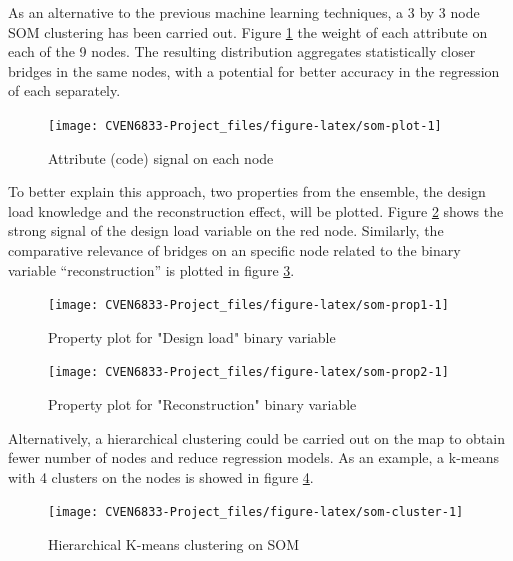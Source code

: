 \documentclass[]{book}
\theoremstyle{definition}
\theoremstyle{definition}
\theoremstyle{definition}
\theoremstyle{remark}
\begin{document}
As an alternative to the previous machine learning techniques, a 3 by 3
node SOM clustering has been carried out. Figure \ref{fig:som-plot} the
weight of each attribute on each of the 9 nodes. The resulting
distribution aggregates statistically closer bridges in the same nodes,
with a potential for better accuracy in the regression of each
separately.

\begin{figure}

{\centering \texttt{[image: CVEN6833-Project\_files/figure-latex/som-plot-1]} 

}

\caption{Attribute (code) signal on each node}\label{fig:som-plot}
\end{figure}

To better explain this approach, two properties from the ensemble, the
design load knowledge and the reconstruction effect, will be plotted.
Figure \ref{fig:som-prop1} shows the strong signal of the design load
variable on the red node. Similarly, the comparative relevance of
bridges on an specific node related to the binary variable
``reconstruction'' is plotted in figure \ref{fig:som-prop2}.

\begin{figure}

{\centering \texttt{[image: CVEN6833-Project\_files/figure-latex/som-prop1-1]} 

}

\caption{Property plot for "Design load" binary variable}\label{fig:som-prop1}
\end{figure}\begin{figure}

{\centering \texttt{[image: CVEN6833-Project\_files/figure-latex/som-prop2-1]} 

}

\caption{Property plot for "Reconstruction" binary variable}\label{fig:som-prop2}
\end{figure}

Alternatively, a hierarchical clustering could be carried out on the map
to obtain fewer number of nodes and reduce regression models. As an
example, a k-means with 4 clusters on the nodes is showed in figure
\ref{fig:som-cluster}.

\begin{figure}

{\centering \texttt{[image: CVEN6833-Project\_files/figure-latex/som-cluster-1]} 

}

\caption{Hierarchical K-means clustering on SOM}\label{fig:som-cluster}
\end{figure}


\end{document}
